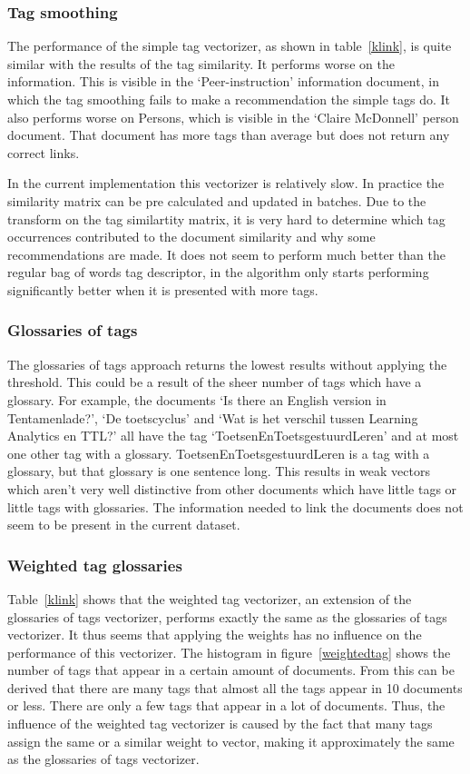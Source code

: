 \subsubsection{Tag smoothing}
The performance of the simple tag vectorizer, as shown in table~\ref{klink}, is
quite similar with the results of the tag similarity. It performs worse on the
information. This is visible in the `Peer-instruction' information document, in which the tag smoothing fails to make a recommendation the simple tags do. It also
performs worse on Persons, which is visible in the `Claire McDonnell' person document. That document has more tags than average but does not return any correct links.

In the current implementation this vectorizer is relatively slow. In practice
the similarity matrix can be pre calculated and updated in batches. Due to the
transform on the tag similartity matrix, it is very hard to determine which tag
occurrences contributed to the document similarity and why some recommendations
are made. It does not seem to perform much better than the regular bag of words
tag descriptor, in \citeauthor{zhou2011web} the algorithm only starts
performing significantly better when it is presented with more tags.

\subsubsection{Glossaries of tags}
The glossaries of tags approach returns the lowest results without applying the
threshold. This could be a result of the sheer number of tags which have a glossary. For
example, the documents `Is there an English version in Tentamenlade?', `De toetscyclus' 
and `Wat is het verschil tussen Learning Analytics en TTL?' all have the 
tag `ToetsenEnToetsgestuurdLeren' and at most one other tag with a glossary. 
ToetsenEnToetsgestuurdLeren is a tag with a glossary, but that glossary is one sentence 
long. This results in weak vectors which aren't very well distinctive from other documents 
which have little tags or little tags with glossaries. The information needed to link the 
documents does not seem to be present in the current dataset.


\subsubsection{Weighted tag glossaries}
Table~\ref{klink} shows that the weighted tag vectorizer, an extension of the glossaries of tags vectorizer, performs exactly the same as the glossaries of tags vectorizer. It thus seems that applying the weights has no influence on the performance of this vectorizer. The histogram in figure~\ref{weightedtag} shows the number of tags that appear in a certain amount of documents. From this can be derived that there are many tags that almost all the tags appear in 10 documents or less. There are only a few tags that appear in a lot of documents. Thus, the influence of the weighted tag vectorizer is caused by the fact that many tags assign the same or a similar weight to vector, making it approximately the same as the glossaries of tags vectorizer.  

